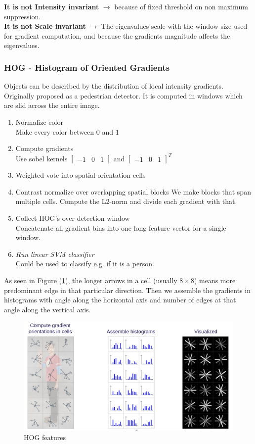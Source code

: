 \documentclass[a4paper]{article}
\begin{document}
 \textbf{It is not Intensity invariant} $ \rightarrow $ because of fixed threshold on non maximum suppression.  \\
 \textbf{It is not Scale invariant} $ \rightarrow $ The eigenvalues scale with the window size used for gradient computation, and because the gradients magnitude affects the eigenvalues. 


\subsubsection{HOG - Histogram of Oriented Gradients}
Objects can be described by the distribution of local intensity gradients. Originally proposed as a pedestrian detector. It is computed in windows which are slid across the entire image. 
\begin{enumerate}
	\item Normalize color \\
		Make every color between 0 and 1
	\item Compute gradients\\
		Use sobel kernels $ \begin{bmatrix} -1 & 0 & 1  \end{bmatrix}  $ and $ \begin{bmatrix} -1 & 0 & 1  \end{bmatrix}^{T}   $
	\item Weighted vote into spatial orientation cells
	\item Contrast normalize over overlapping spatial blocks
		We make blocks that span multiple cells. Compute the L2-norm and divide each gradient with that. 
	\item Collect HOG's over detection window\\
		Concatenate all gradient bins into one long feature vector for a single window. 
	\item \textit{Run linear SVM classifier} \\
		Could be used to classify e.g. if it is a person.
\end{enumerate}
As seen in Figure (\ref{fig:HOG_features}), the longer arrows in a cell (usually $ 8 \times 8 $) means more predominant edge in that particular direction. Then we assemble the gradients in histograms with angle along the horizontal axis and number of edges at that angle along the vertical axis.
\begin{figure}[H]
\centering
\includegraphics[width=\textwidth]{figures/HOG.png}
\caption{HOG features}
\label{fig:HOG_features}
\end{figure} 
\end{document}
